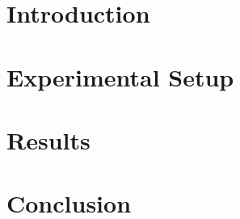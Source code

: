 \documentclass{article}
\begin{document}


\newpage
\thispagestyle{empty}
\tableofcontents
\newpage

\section{Introduction}
\lipsum[1]

\section{Experimental Setup}
\lipsum[2]

\section{Results}
\lipsum[3]

\section{Conclusion}
\lipsum[4]
\end{document}
